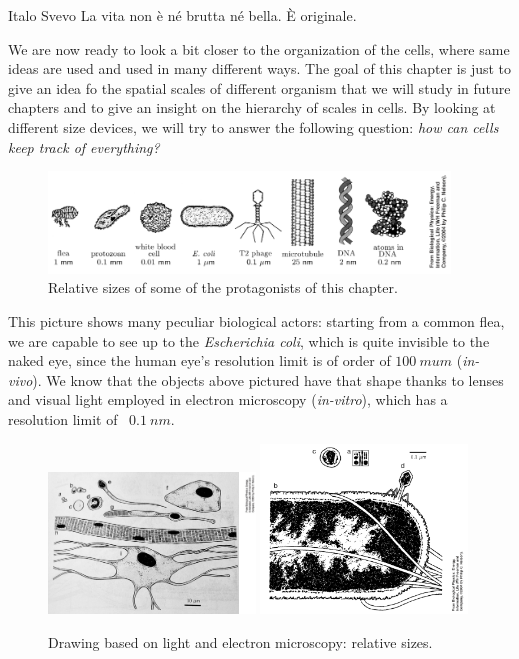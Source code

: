 \documentclass[../main/main.tex]{subfiles}
\begin{document}
\begin{chapquote}{Italo Svevo}
    La vita non è né brutta né bella. È originale.
\end{chapquote}

We are now ready to look a bit closer to the organization of the cells, where same ideas are used and used in many different ways.  The goal of this chapter is just to give an idea fo the spatial scales of different organism that we will study in future chapters and to give an insight on the hierarchy of scales in cells. By looking at different size devices, we will try to answer the following question: \emph{how can cells keep track of everything?}  
\begin{figure}[h!]
    \centering
    \includegraphics[width=0.95\textwidth]{../frontespizio/tikz/1_lesson/spatial_scales.PNG}
    \caption{Relative sizes of some of the protagonists of this chapter.}    
\end{figure}
This picture shows many peculiar biological actors: starting from a common flea, we are capable to see up to the \emph{Escherichia coli}, which is quite invisible to the naked eye, since the human eye's resolution limit is of order of $100\: mu m$ (\emph{in-vivo}). We know that the objects above pictured have that shape thanks to lenses and visual light employed in electron microscopy (\emph{in-vitro}), which has a resolution limit of ~$0.1\:nm$.

\begin{figure}[h!] 
    \centering
    \includegraphics[width=0.49\textwidth]{../frontespizio/tikz/1_lesson/Drawing.jpg}
    \includegraphics[width=0.49\textwidth]{../frontespizio/tikz/1_lesson/drawing_electron.PNG}
    \caption{\label{fig:2_2} Drawing based on light and electron microscopy: relative sizes.} 
\end{figure}
\end{document}
